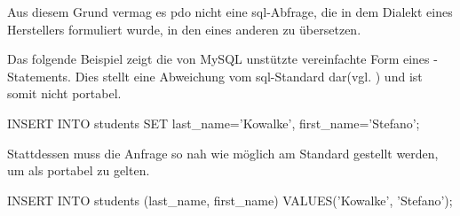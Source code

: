 Aus diesem Grund vermag es \gls{pdo} nicht eine \gls{sql}-Abfrage, die in dem Dialekt eines Herstellers formuliert wurde, in den eines anderen zu übersetzen.

Das folgende Beispiel zeigt die von MySQL unstützte vereinfachte Form eines -Statements. Dies stellt eine Abweichung vom \gls{sql}-Standard dar(vgl. \cite[S. 388]{website:SQLStandard1992}) und ist somit nicht portabel.

\begin{listing}[H]
\begin{mysqlcode}
INSERT INTO students SET last_name='Kowalke', first_name='Stefano';
\end{mysqlcode}
\caption{}
\label{lst:notPortableSQL}
\end{listing}

Stattdessen muss die Anfrage so nah wie möglich am Standard gestellt werden, um als portabel zu gelten.

\begin{listing}[H]
\begin{mysqlcode}
INSERT INTO students (last_name, first_name) VALUES('Kowalke', 'Stefano');
\end{mysqlcode}
\caption{}
\label{lst:portableSQL}
\end{listing}
